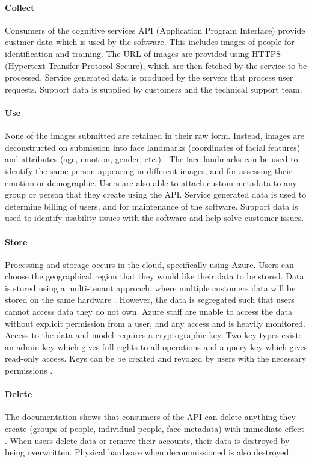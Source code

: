 \documentclass[12pt]{extarticle}
\begin{document}
\paragraph{Collect} Consumers of the cognitive services API (Application Program Interface) provide custmer data which is used by the software. 
This includes images of people for identification and training. 
The URL of images are provided using HTTPS (Hypertext Transfer Protocol Secure), which are then fetched by the service to be processed. 
Service generated data is produced by the servers that process user requests. 
Support data is supplied by customers and the technical support team.

\paragraph{Use}
None of the images submitted are retained in their raw form. 
Instead, images are deconstructed on submission into face landmarks (coordinates of facial features) and attributes (age, emotion, gender, etc.) \cite{patrickfarley}. The face landmarks can be used to identify the same person appearing in different images, and for assessing their emotion or demographic. Users are also able to attach custom metadata to any group or person that they create using the API. 
Service generated data is used to determine billing of users, and for maintenance of the software.
Support data is used to identify usability issues with the software and help solve customer issues.

\paragraph{Store}
Processing and storage occurs in the cloud, specifically using Azure. 
Users can choose the geographical region that they would like their data to be stored. 
Data is stored using a multi-tenant approach, where multiple customers data will be stored on the same hardware \cite{terrylanfear}. 
However, the data is segregated such that users cannot access data they do not own.
Azure staff are unable to access the data without explicit permission from a user, and any access and is heavily monitored. 
Access to the data and model requires a cryptographic key. Two key types exist: an admin key which gives full rights to all operations and a query key which gives read-only access. Keys can be be created and revoked by users with the necessary permissions \cite{heidisteen}.

\paragraph{Delete}
The documentation shows that consumers of the API can delete anything they create (groups of people, individual people, face metadata) with immediate effect \cite{documentation}. 
When users delete data or remove their accounts, their data is destroyed by being overwritten. 
Physical hardware when decommissioned is also destroyed.
\end{document}
